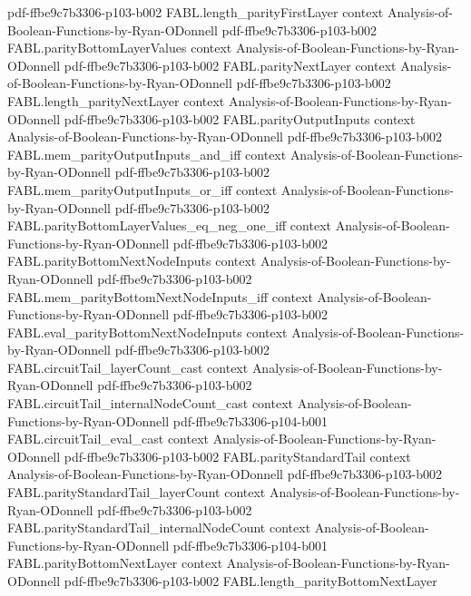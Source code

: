 \begin{theorem}
{    pdf-ffbe9c7b3306-p103-b002}
\proofstep
  {FABL.length_parityFirstLayer}
  {context}
  {Analysis-of-Boolean-Functions-by-Ryan-ODonnell}
  {pdf-ffbe9c7b3306-p103-b002}
\proofstep
  {FABL.parityBottomLayerValues}
  {context}
  {Analysis-of-Boolean-Functions-by-Ryan-ODonnell}
  {pdf-ffbe9c7b3306-p103-b002}
\proofstep
  {FABL.parityNextLayer}
  {context}
  {Analysis-of-Boolean-Functions-by-Ryan-ODonnell}
  {pdf-ffbe9c7b3306-p103-b002}
\proofstep
  {FABL.length_parityNextLayer}
  {context}
  {Analysis-of-Boolean-Functions-by-Ryan-ODonnell}
  {pdf-ffbe9c7b3306-p103-b002}
\proofstep
  {FABL.parityOutputInputs}
  {context}
  {Analysis-of-Boolean-Functions-by-Ryan-ODonnell}
  {pdf-ffbe9c7b3306-p103-b002}
\proofstep
  {FABL.mem_parityOutputInputs_and_iff}
  {context}
  {Analysis-of-Boolean-Functions-by-Ryan-ODonnell}
  {pdf-ffbe9c7b3306-p103-b002}
\proofstep
  {FABL.mem_parityOutputInputs_or_iff}
  {context}
  {Analysis-of-Boolean-Functions-by-Ryan-ODonnell}
  {pdf-ffbe9c7b3306-p103-b002}
\proofstep
  {FABL.parityBottomLayerValues_eq_neg_one_iff}
  {context}
  {Analysis-of-Boolean-Functions-by-Ryan-ODonnell}
  {pdf-ffbe9c7b3306-p103-b002}
\proofstep
  {FABL.parityBottomNextNodeInputs}
  {context}
  {Analysis-of-Boolean-Functions-by-Ryan-ODonnell}
  {pdf-ffbe9c7b3306-p103-b002}
\proofstep
  {FABL.mem_parityBottomNextNodeInputs_iff}
  {context}
  {Analysis-of-Boolean-Functions-by-Ryan-ODonnell}
  {pdf-ffbe9c7b3306-p103-b002}
\proofstep
  {FABL.eval_parityBottomNextNodeInputs}
  {context}
  {Analysis-of-Boolean-Functions-by-Ryan-ODonnell}
  {pdf-ffbe9c7b3306-p103-b002}
\proofstep
  {FABL.circuitTail_layerCount_cast}
  {context}
  {Analysis-of-Boolean-Functions-by-Ryan-ODonnell}
  {pdf-ffbe9c7b3306-p103-b002}
\proofstep
  {FABL.circuitTail_internalNodeCount_cast}
  {context}
  {Analysis-of-Boolean-Functions-by-Ryan-ODonnell}
  {pdf-ffbe9c7b3306-p104-b001}
\proofstep
  {FABL.circuitTail_eval_cast}
  {context}
  {Analysis-of-Boolean-Functions-by-Ryan-ODonnell}
  {pdf-ffbe9c7b3306-p103-b002}
\proofstep
  {FABL.parityStandardTail}
  {context}
  {Analysis-of-Boolean-Functions-by-Ryan-ODonnell}
  {pdf-ffbe9c7b3306-p103-b002}
\proofstep
  {FABL.parityStandardTail_layerCount}
  {context}
  {Analysis-of-Boolean-Functions-by-Ryan-ODonnell}
  {pdf-ffbe9c7b3306-p103-b002}
\proofstep
  {FABL.parityStandardTail_internalNodeCount}
  {context}
  {Analysis-of-Boolean-Functions-by-Ryan-ODonnell}
  {pdf-ffbe9c7b3306-p104-b001}
\proofstep
  {FABL.parityBottomNextLayer}
  {context}
  {Analysis-of-Boolean-Functions-by-Ryan-ODonnell}
  {pdf-ffbe9c7b3306-p103-b002}
\proofstep
  {FABL.length_parityBottomNextLayer}

\end{theorem}
